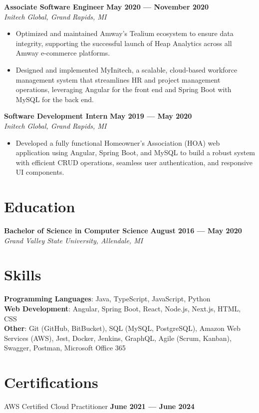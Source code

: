 \documentclass{article}
\begin{document}
\textbf{Associate Software Engineer} \hfill \textbf{May 2020 --- November 2020}\\
\textit{Initech Global, Grand Rapids, MI}
\begin{itemize}
  \item Optimized and maintained Amway’s Tealium ecosystem to ensure data integrity, supporting the successful launch of Heap Analytics across all Amway e-commerce platforms.
  \item Designed and implemented MyInitech, a scalable, cloud-based workforce management system that streamlines HR and project management operations, leveraging Angular for the front end and Spring Boot with MySQL for the back end.
\end{itemize}
\medskip

\textbf{Software Development Intern} \hfill \textbf{May 2019 --- May 2020}\\
\textit{Initech Global, Grand Rapids, MI}
\begin{itemize}
  \item Developed a fully functional Homeowner's Association (HOA) web application using Angular, Spring Boot, and MySQL to build a robust system with efficient CRUD operations, seamless user authentication, and responsive UI components.
\end{itemize}

\section*{Education}
\textbf{Bachelor of Science in Computer Science} \hfill \textbf{August 2016 --- May 2020}\\
\textit{Grand Valley State University, Allendale, MI}
\section*{Skills}
\textbf{Programming Languages}: Java, TypeScript, JavaScript, Python\\
\textbf{Web Development}: Angular, Spring Boot, React, Node.js, Next.js, HTML, CSS\\
\textbf{Other}: Git (GitHub, BitBucket), SQL (MySQL, PostgreSQL), Amazon Web Services (AWS), Jest, Docker, Jenkins, GraphQL, Agile (Scrum, Kanban), Swagger, Postman, Microsoft Office 365

\section*{Certifications}
AWS Certified Cloud Practitioner \hfill \textbf{June 2021 --- June 2024}
\end{document}
